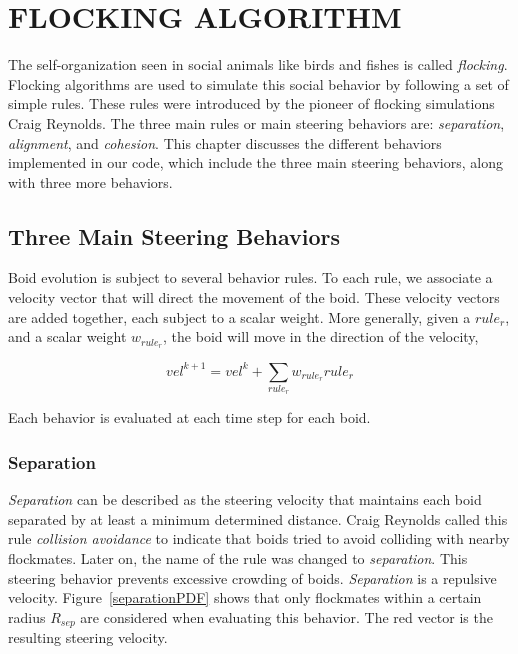\chapter{FLOCKING ALGORITHM}\label{chap3}

The self-organization seen in social animals like birds and fishes is called \textit{flocking}. Flocking algorithms are used to simulate this social behavior by following a set of simple rules. These rules were introduced by the pioneer of flocking simulations Craig Reynolds\cite{craig1}. The three main rules or main steering behaviors are: \textit{separation}, \textit{alignment}, and \textit{cohesion}. This chapter discusses the different behaviors implemented in our code, which include the three main steering behaviors, along with three more behaviors.

\section{Three Main Steering Behaviors}
Boid evolution is subject to several behavior rules. To each rule, we associate a velocity vector that will direct the movement of the boid. These velocity vectors are added together, each subject to a scalar weight. More generally, given a $rule_r$, and a scalar weight $w_{rule_r}$, the boid will move in the direction of the velocity, 

	\begin{equation}
	vel^{k+1} = vel^{k} + \sum_{rule_r} w_{rule_r} {rule_r}
	\end{equation}
	
Each behavior is evaluated at each time step for each boid.

\subsection{Separation}\label{separationsection}
\textit{Separation} can be described as the steering velocity that maintains each boid separated by at least a minimum determined distance. Craig Reynolds called this rule \textit{collision avoidance} to indicate that boids tried to avoid colliding with nearby flockmates. Later on, the name of the rule was changed to \textit{separation}. This steering behavior prevents excessive crowding of boids. \textit{Separation} is a repulsive velocity. Figure~\ref{separationPDF} shows that only flockmates within a certain radius $R_{sep}$ are considered when evaluating this behavior. The red vector is the resulting steering velocity.

